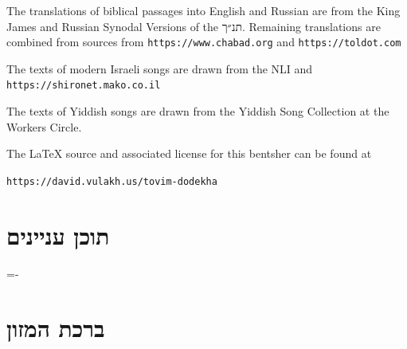 \documentclass[11pt,twoside]{article}
\newif\ifbaypsalmbook
\renewcommand{\sectionmark}[1]{\markboth{#1}{}}
\begin{document}
{\begin{english}
{\ifbaypsalmbook%
The English translations of Psalms are from the Bay Psalm Book
({\englishprose\textit{%
The Whole Booke of Psalmes Faithfully Translated into English Metre%
}}). Remaining
\else%
The
\fi%
translations of biblical passages into English and
Russian are from the King James and Russian Synodal Versions of the
\texthebrew{\prose תנ״ך}.
Remaining translations are combined from sources from
{\englishprose\texttt{https://www.chabad.org}}
and
{\englishprose\texttt{https://toldot.com}}

{\centering%
The texts of modern Israeli songs are drawn from the NLI and
{\englishprose\texttt{https://shironet.mako.co.il}}\par
}

The texts of Yiddish songs are drawn from the Yiddish Song Collection
at the Workers Circle.\par
}
\vspace{\baselineskip}%
{\tiny%
The {\englishprose\LaTeX} source and associated license for this
bentsher can be found at\par
{\scriptsize\texttt{https://david.vulakh.us/tovim-dodekha}\par}
}
\end{english}
\vfill%
}

\clearpage
\restoregeometry
\newpage
{%
\scriptsize%
\setcounter{page}{1}%
\setlength{\parskip}{1pt}%
\setlength{\itemsep}{1pt}%
\sectionmark{תוכן עניינים}%
\section*{תוכן עניינים}
\lineskiplimit=-\maxdimen%
\begin{multicols}{2}
\tableofcontents
\end{multicols}
}
\newpage

\section{ברכת המזון}
\end{document}
